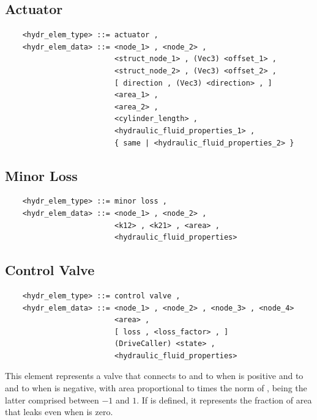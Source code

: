 \subsection{Actuator}
\begin{verbatim}
    <hydr_elem_type> ::= actuator ,
    <hydr_elem_data> ::= <node_1> , <node_2> , 
                         <struct_node_1> , (Vec3) <offset_1> ,
                         <struct_node_2> , (Vec3) <offset_2> ,
                         [ direction , (Vec3) <direction> , ]
                         <area_1> ,
                         <area_2> ,
                         <cylinder_length> ,
                         <hydraulic_fluid_properties_1> ,
                         { same | <hydraulic_fluid_properties_2> }
\end{verbatim}

\subsection{Minor Loss}
\begin{verbatim}
    <hydr_elem_type> ::= minor loss ,
    <hydr_elem_data> ::= <node_1> , <node_2> ,
                         <k12> , <k21> , <area> ,
                         <hydraulic_fluid_properties>
\end{verbatim}

\subsection{Control Valve}
\begin{verbatim}
    <hydr_elem_type> ::= control valve ,
    <hydr_elem_data> ::= <node_1> , <node_2> , <node_3> , <node_4>
                         <area> ,
                         [ loss , <loss_factor> , ]
                         (DriveCaller) <state> ,
                         <hydraulic_fluid_properties>
\end{verbatim}
This element represents a valve that connects
 to  and  to 
when  is positive and  to 
and  to  when  is negative,
with area proportional to  times the norm of , 
being the latter comprised between $-1$ and $1$.
If  is defined, it represents the fraction
of area that leaks even when  is zero.



